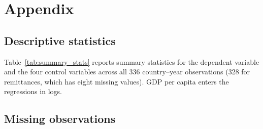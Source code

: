 
\appendix
\section{Appendix}

\let\oldsubsection\subsection
\renewcommand{\subsection}{\FloatBarrier\oldsubsection}

\subsection{Descriptive statistics}
\label{app:summary-stats}

Table~\ref{tab:summary_stats} reports summary statistics for the dependent variable and the four control variables across all 336 country--year observations (328 for remittances, which has eight missing values). GDP per capita enters the regressions in logs.



\subsection{Missing observations}
\label{app:missingness}

